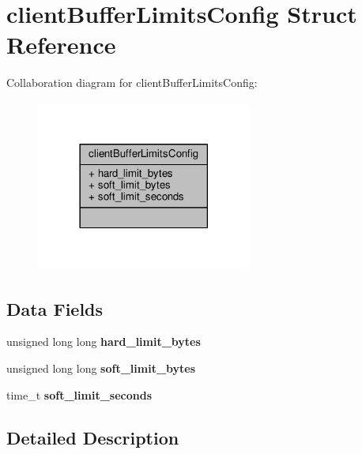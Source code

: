\hypertarget{structclientBufferLimitsConfig}{}\section{client\+Buffer\+Limits\+Config Struct Reference}
\label{structclientBufferLimitsConfig}


Collaboration diagram for client\+Buffer\+Limits\+Config\+:\nopagebreak
\begin{figure}[H]
\begin{center}
\leavevmode
\includegraphics[width=201pt]{structclientBufferLimitsConfig__coll__graph}
\end{center}
\end{figure}
\subsection*{Data Fields}
\begin{DoxyCompactItemize}
\item 
\mbox{\label{structclientBufferLimitsConfig_aae70a981b441e86c15bac720d09489d1}} 
unsigned long long {\bfseries hard\+\_\+limit\+\_\+bytes}
\item 
\mbox{\label{structclientBufferLimitsConfig_a902b5c41d03cc56b4ef0ceb40a43f9f3}} 
unsigned long long {\bfseries soft\+\_\+limit\+\_\+bytes}
\item 
\mbox{\label{structclientBufferLimitsConfig_a50c38492435c6e133db45f4b2b79ce1d}} 
time\+\_\+t {\bfseries soft\+\_\+limit\+\_\+seconds}
\end{DoxyCompactItemize}


\subsection{Detailed Description}


